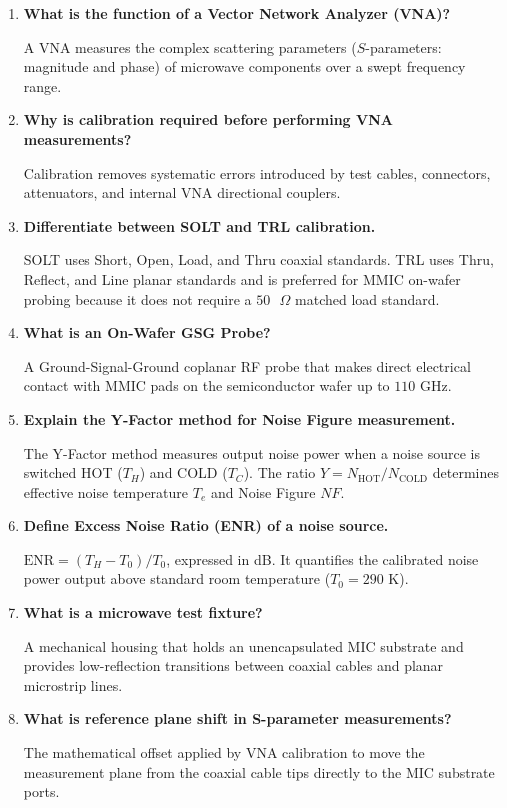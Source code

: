 \documentclass[12pt,a4paper]{article}
\newcommand{\Q}[1]{\textbf{#1}\par\noindent\ignorespaces}
\begin{document}
\begin{tcolorbox}[exambox, title={\textbf{Frequently Asked / Viva Questions}}]
  \begin{enumerate}[topsep=0pt, label=\textbf{Q\arabic*.}, itemsep=5pt]
    \item \Q{What is the function of a Vector Network Analyzer (VNA)?}
    A VNA measures the complex scattering parameters ($S$-parameters: magnitude and phase) of microwave components over a swept frequency range.

    \item \Q{Why is calibration required before performing VNA measurements?}
    Calibration removes systematic errors introduced by test cables, connectors, attenuators, and internal VNA directional couplers.

    \item \Q{Differentiate between SOLT and TRL calibration.}
    SOLT uses Short, Open, Load, and Thru coaxial standards. TRL uses Thru, Reflect, and Line planar standards and is preferred for MMIC on-wafer probing because it does not require a $50\text{ }\Omega$ matched load standard.

    \item \Q{What is an On-Wafer GSG Probe?}
    A Ground-Signal-Ground coplanar RF probe that makes direct electrical contact with MMIC pads on the semiconductor wafer up to $110\text{ GHz}$.

    \item \Q{Explain the Y-Factor method for Noise Figure measurement.}
    The Y-Factor method measures output noise power when a noise source is switched HOT ($T_H$) and COLD ($T_C$). The ratio $Y = N_{\text{HOT}}/N_{\text{COLD}}$ determines effective noise temperature $T_e$ and Noise Figure $NF$.

    \item \Q{Define Excess Noise Ratio (ENR) of a noise source.}
    $\text{ENR} = (T_H - T_0)/T_0$, expressed in dB. It quantifies the calibrated noise power output above standard room temperature ($T_0 = 290\text{ K}$).

    \item \Q{What is a microwave test fixture?}
    A mechanical housing that holds an unencapsulated MIC substrate and provides low-reflection transitions between coaxial cables and planar microstrip lines.

    \item \Q{What is reference plane shift in S-parameter measurements?}
    The mathematical offset applied by VNA calibration to move the measurement plane from the coaxial cable tips directly to the MIC substrate ports.


\end{enumerate}
\end{tcolorbox}
\end{document}
